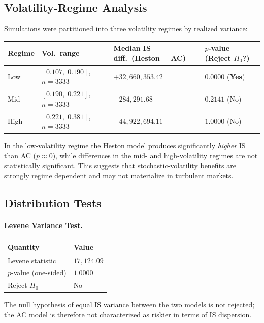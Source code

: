 \documentclass[11pt]{article}
\begin{document}
\subsection{Volatility-Regime Analysis}

Simulations were partitioned into three volatility regimes by realized variance:

\begin{center}
\begin{tabular}{llll}
\toprule
Regime & Vol.\ range & Median IS diff.\ (Heston $-$ AC) & $p$-value (Reject $H_0$?) \\
\midrule
Low & $[0.107,\; 0.190]$, $n=3333$ & $+32{,}660{,}353.42$ & $0.0000$ (\textbf{Yes}) \\
Mid & $[0.190,\; 0.221]$, $n=3333$ & $-284{,}291.68$ & $0.2141$ (No) \\
High & $[0.221,\; 0.381]$, $n=3333$ & $-44{,}922{,}694.11$ & $1.0000$ (No) \\
\bottomrule
\end{tabular}
\end{center}

In the low-volatility regime the Heston model produces significantly \emph{higher} IS than AC ($p \approx 0$), while differences in the mid- and high-volatility regimes are not statistically significant. This suggests that stochastic-volatility benefits are strongly regime dependent and may not materialize in turbulent markets.

\subsection{Distribution Tests}

\paragraph{Levene Variance Test.}
\begin{center}
\begin{tabular}{ll}
\toprule
Quantity & Value \\
\midrule
Levene statistic & $17{,}124.09$ \\
$p$-value (one-sided) & $1.0000$ \\
Reject $H_0$ & No \\
\bottomrule
\end{tabular}
\end{center}
The null hypothesis of equal IS variance between the two models is not rejected; the AC model is therefore not characterized as riskier in terms of IS dispersion.
\end{document}
